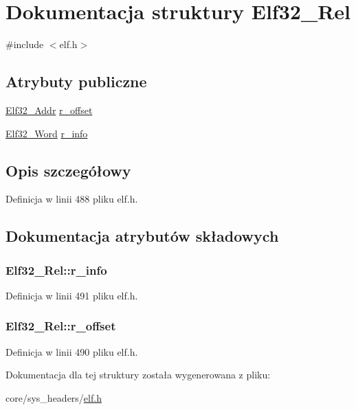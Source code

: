 \hypertarget{struct_elf32___rel}{\section{Dokumentacja struktury Elf32\-\_\-\-Rel}
\label{struct_elf32___rel}
}


{\ttfamily \#include $<$elf.\-h$>$}

\subsection*{Atrybuty publiczne}
\begin{DoxyCompactItemize}
\item 
\hyperlink{elf_8h_a40c6d4571e6001f443cc6a6474620158}{Elf32\-\_\-\-Addr} \hyperlink{struct_elf32___rel_addcf5ef67ababeb4940889e912c11eff}{r\-\_\-offset}
\item 
\hyperlink{elf_8h_af5924ece606c732e86f8263a19408e45}{Elf32\-\_\-\-Word} \hyperlink{struct_elf32___rel_a81c52bb1589056c5d37d58b9bfe2a046}{r\-\_\-info}
\end{DoxyCompactItemize}


\subsection{Opis szczegółowy}


Definicja w linii 488 pliku elf.\-h.



\subsection{Dokumentacja atrybutów składowych}
\hypertarget{struct_elf32___rel_a81c52bb1589056c5d37d58b9bfe2a046}{
\subsubsection[{r\-\_\-info}]{ Elf32\-\_\-\-Rel\-::r\-\_\-info}}\label{struct_elf32___rel_a81c52bb1589056c5d37d58b9bfe2a046}


Definicja w linii 491 pliku elf.\-h.

\hypertarget{struct_elf32___rel_addcf5ef67ababeb4940889e912c11eff}{
\subsubsection[{r\-\_\-offset}]{ Elf32\-\_\-\-Rel\-::r\-\_\-offset}}\label{struct_elf32___rel_addcf5ef67ababeb4940889e912c11eff}


Definicja w linii 490 pliku elf.\-h.



Dokumentacja dla tej struktury została wygenerowana z pliku\-:\begin{DoxyCompactItemize}
\item 
core/sys\-\_\-headers/\hyperlink{elf_8h}{elf.\-h}\end{DoxyCompactItemize}
